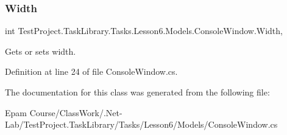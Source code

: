 \subsubsection{\texorpdfstring{Width}{Width}}
{\footnotesize\ttfamily int Test\+Project.\+Task\+Library.\+Tasks.\+Lesson6.\+Models.\+Console\+Window.\+Width\hspace{0.3cm}{\ttfamily [get]}, {\ttfamily [set]}}



Gets or sets width. 



Definition at line 24 of file Console\+Window.\+cs.



The documentation for this class was generated from the following file\+:\begin{DoxyCompactItemize}
\item 
Epam Course/\+Class\+Work/.\+Net-\/\+Lab/\+Test\+Project.\+Task\+Library/\+Tasks/\+Lesson6/\+Models/Console\+Window.\+cs\end{DoxyCompactItemize}

